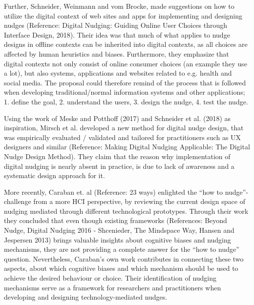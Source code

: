 Further, Schneider, Weinmann and vom Brocke, made suggestions on how to utilize the digital context of web sites and apps for implementing and designing nudges (Reference: Digital Nudging: Guiding Online User Choices through Interface Design, 2018). Their idea was that much of what applies to nudge designs in offline contexts can be inherited into digital contexts, as all choices are affected by human heuristics and biases. Furthermore, they emphasize that digital contexts not only consist of online consumer choices (an example they use a lot), but also systems, applications and websites related to e.g. health and social media. The proposal could therefore remind of the process that is followed when developing traditional/normal information systems and other applications; 1. define  the  goal, 2. understand  the  users, 3. design  the  nudge,  4. test  the  nudge. 

Using the work of Meske and Potthoff (2017) and Schneider et al. (2018) as inspiration, Mirsch et al. developed a new method for digital nudge design, that was empirically evaluated / validated and tailored for practitioners such as UX designers and similar (Reference: Making Digital Nudging Applicable: The Digital Nudge Design Method). They claim that the reason why implementation of digital nudging is nearly absent in practice, is due to lack of awareness and a systematic design approach for it.

More recently, Caraban et. al (Reference: 23 ways) enlighted the “how to nudge”-challenge from a more HCI perspective, by reviewing the current design space of nudging mediated through different technological prototypes. Through their work they concluded that even though existing frameworks (References: Beyond Nudge, Digital Nudging 2016 - Shcenieder, The Mindspace Way, Hansen and Jespersen 2013) brings valuable insights about cognitive biases and nudging mechanisms, they are not providing a complete answer for the “how to nudge” question. Nevertheless, Caraban’s own work contributes in connecting these two aspects, about which cognitive biases and which mechanism should be used to achieve the desired behaviour or choice. Their identification of nudging mechanisms serve as a framework for researchers and practitioners when developing and designing technology-mediated nudges. %


